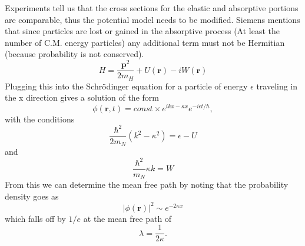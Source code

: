 \documentclass[12pt]{extarticle}
\begin{document}
Experiments tell us that the cross sections for the elastic and absorptive portions are comparable, thus the potential model needs to be modified. Siemens mentions that since particles are lost or gained in the absorptive process (At least the number of C.M. energy particles) any additional term must not be Hermitian (because probability is not conserved).
\begin{equation}
   H=\frac{\mathbf{p}^2}{2m_H} + U(\mathbf{r}) - iW(\mathbf{r})
\end{equation}
Plugging this into the Schr\"odinger equation for a particle of energy $\epsilon$ traveling in the x direction gives a solution of the form
\begin{equation}
   \phi(\mathbf{r},t) = const \times e^{ikx-\kappa x}e^{-i\epsilon t/\hbar},
\end{equation}
with the conditions
\begin{equation}
   \frac{\hbar^2}{2m_N}(k^2-\kappa^2) = \epsilon - U
\end{equation}
and
\begin{equation}
   \frac{\hbar^2}{m_N}\kappa k = W
   \label{eq:Wwithkappa}
\end{equation}
From this we can determine the mean free path by noting that the probability density goes as
\begin{equation}
   \left|\phi(\mathbf{r})\right|^2 \sim e^{-2\kappa x}
\end{equation}
which falls off by $1/e$ at the mean free path of
\begin{equation}
   \lambda = \frac{1}{2\kappa}.
   \label{eq:meanfreepath}
\end{equation}
\end{document}
